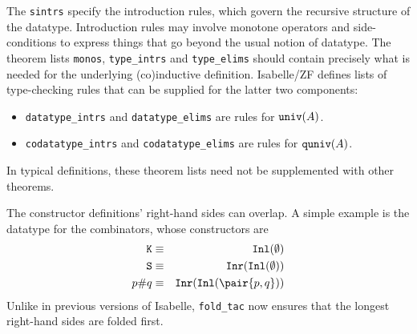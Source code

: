 The {\tt sintrs} specify the introduction rules, which govern the recursive
structure of the datatype.  Introduction rules may involve monotone
operators and side-conditions to express things that go beyond the usual
notion of datatype.  The theorem lists {\tt monos}, {\tt type\_intrs} and
{\tt type\_elims} should contain precisely what is needed for the
underlying (co)inductive definition.  Isabelle/ZF defines lists of
type-checking rules that can be supplied for the latter two components:
\begin{itemize}
\item {\tt datatype\_intrs} and {\tt datatype\_elims} are rules
for $\hbox{\tt univ}(A)$.
\item {\tt codatatype\_intrs} and {\tt codatatype\_elims} are
rules for $\hbox{\tt quniv}(A)$.
\end{itemize}
In typical definitions, these theorem lists need not be supplemented with
other theorems.

The constructor definitions' right-hand sides can overlap.  A
simple example is the datatype for the combinators, whose constructors are 
\begin{eqnarray*}
  {\tt K} & \equiv & \Inl(\emptyset) \\
  {\tt S} & \equiv & \Inr(\Inl(\emptyset)) \\
  p{\tt\#}q & \equiv & \Inr(\Inl(\pair{p,q})) 
\end{eqnarray*}
Unlike in previous versions of Isabelle, \verb|fold_tac| now ensures that the
longest right-hand sides are folded first.

\fi

